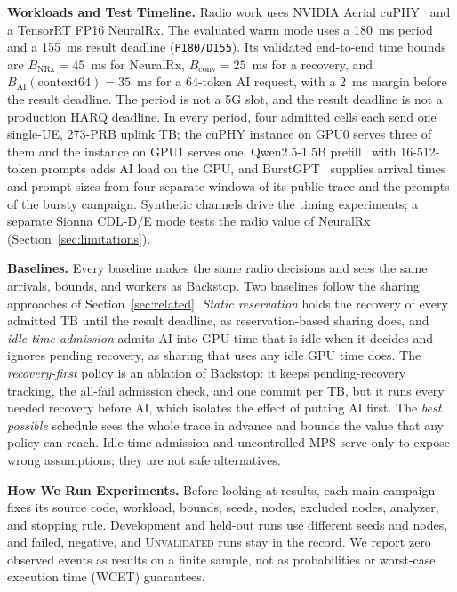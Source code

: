 \documentclass[acmsmall,screen,review,anonymous]{acmart}
\newcommand{\sys}{Backstop\xspace}
\newcommand{\UQ}{\textsc{Unvalidated}\xspace}
\newcommand{\NRx}{NeuralRx\xspace}
\begin{document}
\noindent\textbf{Workloads and Test Timeline.}
Radio work uses NVIDIA Aerial cuPHY~\cite{aerial} and a TensorRT FP16 \NRx. The evaluated warm mode uses
a 180~ms period and a 155~ms result deadline (\texttt{P180/D155}). Its validated end-to-end time bounds
are $B_{\mathrm{NRx}}=45$~ms for \NRx, $B_{\mathrm{conv}}=25$~ms for a recovery, and
$B_{\mathrm{AI}}(\text{context64})=35$~ms for a 64-token AI request, with a 2~ms margin before the result
deadline. The period is not a 5G slot, and the result deadline is not a production HARQ deadline. In every
period, four admitted cells each send one single-UE, 273-PRB uplink TB; the cuPHY instance on GPU0 serves
three of them and the instance on GPU1 serves one. Qwen2.5-1.5B prefill~\cite{qwen25} with 16-512-token
prompts adds AI load on the GPU, and BurstGPT~\cite{burstgpt} supplies arrival times and prompt sizes from
four separate windows of its public trace and the prompts of the bursty campaign. Synthetic channels
drive the timing experiments; a separate Sionna CDL-D/E mode tests the radio value of \NRx
(Section~\ref{sec:limitations}).

\noindent\textbf{Baselines.}
Every baseline makes the same radio decisions and sees the same arrivals, bounds, and workers as \sys.
Two baselines follow the sharing approaches of Section~\ref{sec:related}. \emph{Static reservation}
holds the recovery of every admitted TB until the result deadline, as reservation-based sharing does, and
\emph{idle-time admission} admits AI into GPU time that is idle when it decides and ignores pending
recovery, as sharing that uses any idle GPU time does. The \emph{recovery-first} policy is an ablation of
\sys: it keeps pending-recovery tracking, the all-fail admission check, and one commit per TB, but it runs
every needed recovery before AI, which isolates the effect of putting AI first. The \emph{best possible}
schedule sees the whole trace in advance and bounds the value that any policy can reach. Idle-time
admission and uncontrolled MPS serve only to expose wrong assumptions; they are not safe alternatives.

\noindent\textbf{How We Run Experiments.}
Before looking at results, each main campaign fixes its source code, workload, bounds, seeds, nodes,
excluded nodes, analyzer, and stopping rule. Development and held-out runs use different seeds and nodes,
and failed, negative, and \UQ runs stay in the record. We report zero observed events as results on a
finite sample, not as probabilities or worst-case execution time (WCET) guarantees.
\end{document}
